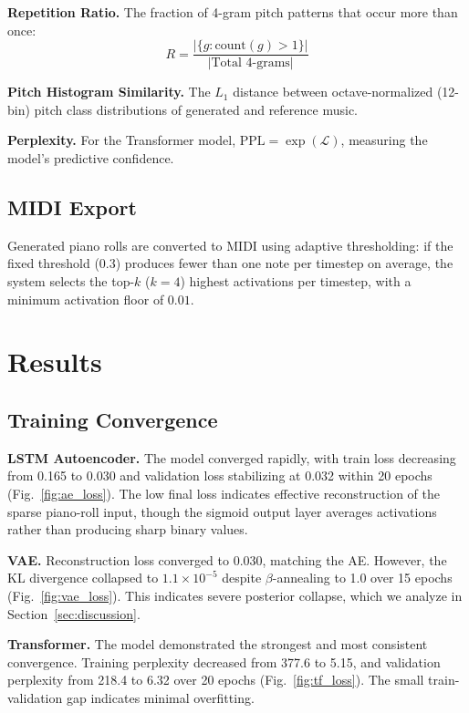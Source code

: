 \documentclass[conference]{IEEEtran}
\begin{document}
\textbf{Repetition Ratio.} The fraction of 4-gram pitch patterns that occur more than once:
\begin{equation}
    R = \frac{|\{g : \text{count}(g) > 1\}|}{|\text{Total 4-grams}|}
\end{equation}

\textbf{Pitch Histogram Similarity.} The $L_1$ distance between octave-normalized (12-bin) pitch class distributions of generated and reference music.

\textbf{Perplexity.} For the Transformer model, $\text{PPL} = \exp(\mathcal{L})$, measuring the model's predictive confidence.

\subsection{MIDI Export}
Generated piano rolls are converted to MIDI using adaptive thresholding: if the fixed threshold ($0.3$) produces fewer than one note per timestep on average, the system selects the top-$k$ ($k=4$) highest activations per timestep, with a minimum activation floor of $0.01$.

\section{Results}

\subsection{Training Convergence}

\textbf{LSTM Autoencoder.} The model converged rapidly, with train loss decreasing from 0.165 to 0.030 and validation loss stabilizing at 0.032 within 20 epochs (Fig.~\ref{fig:ae_loss}). The low final loss indicates effective reconstruction of the sparse piano-roll input, though the sigmoid output layer averages activations rather than producing sharp binary values.

\textbf{VAE.} Reconstruction loss converged to 0.030, matching the AE. However, the KL divergence collapsed to $1.1 \times 10^{-5}$ despite $\beta$-annealing to 1.0 over 15 epochs (Fig.~\ref{fig:vae_loss}). This indicates severe posterior collapse, which we analyze in Section~\ref{sec:discussion}.

\textbf{Transformer.} The model demonstrated the strongest and most consistent convergence. Training perplexity decreased from 377.6 to 5.15, and validation perplexity from 218.4 to 6.32 over 20 epochs (Fig.~\ref{fig:tf_loss}). The small train-validation gap indicates minimal overfitting.
\end{document}
